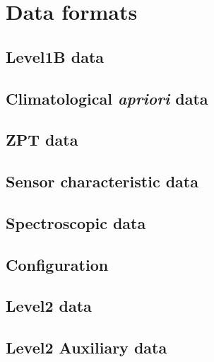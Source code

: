
\chapter{Data formats}
\label{sec:dataformat}

\section{Level1B data}
\section{Climatological \textit{apriori} data}
\section{ZPT data}
\section{Sensor characteristic data}
\section{Spectroscopic data}
\section{Configuration}
\section{Level2 data}
\section{Level2 Auxiliary data}


